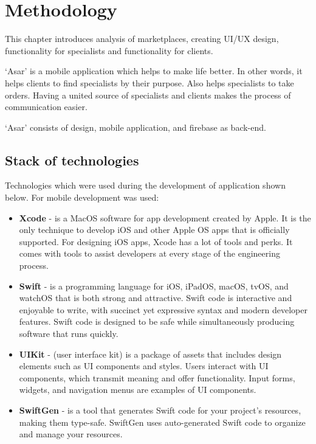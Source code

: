 \chapter{Methodology}\label{ch:A}
\hspace{10mm}This chapter introduces analysis of marketplaces, creating UI/UX design,
functionality for specialists and functionality for clients.


‘Asar’  is a mobile application which helps to make life better. In other words, it helps clients to find specialists by their purpose. Also helps specialists to take orders. Having a united source of specialists and clients makes the process of communication easier.


‘Asar’ consists of design,  mobile application, and firebase as back-end.

\section{Stack of technologies}
\hspace{7mm}Technologies which were used during the development of application shown below. \newline
For mobile development was used:
\begin{itemize}
    \item \textbf{Xcode} - is a MacOS software for app development created by Apple. It is the only technique to develop iOS and other Apple OS apps that is officially supported. For designing iOS apps, Xcode has a lot of tools and perks. It comes with tools to assist developers at every stage of the engineering process.
    \item \textbf{Swift} - is a programming language for iOS, iPadOS, macOS, tvOS, and watchOS that is both strong and attractive. Swift code is interactive and enjoyable to write, with succinct yet expressive syntax and modern developer features. Swift code is designed to be safe while simultaneously producing software that runs quickly. 
    \item \textbf{UIKit} -  (user interface kit) is a package of assets that includes design elements such as UI components and styles. Users interact with UI components, which transmit meaning and offer functionality. Input forms, widgets, and navigation menus are examples of UI components.
    \item \textbf{SwiftGen} - is a tool that generates Swift code for your project's resources, making them type-safe. SwiftGen uses auto-generated Swift code to organize and manage your resources.
\end{itemize}
